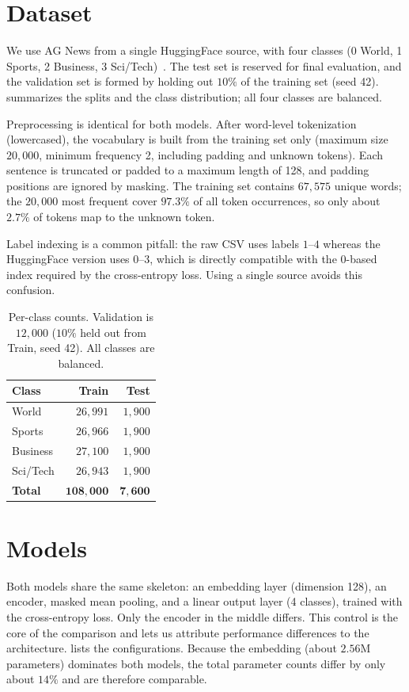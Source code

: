 \documentclass[10pt,twocolumn,letterpaper]{article}
\begin{document}
\section{Dataset}
We use AG News from a single HuggingFace source, with four classes (0 World,
1 Sports, 2 Business, 3 Sci/Tech)~\cite{zhang2015character}. The test set is
reserved for final evaluation, and the validation set is formed by holding out
$10\%$ of the training set (seed 42).  summarizes the splits
and the class distribution; all four classes are balanced.

Preprocessing is identical for both models. After word-level tokenization
(lowercased), the vocabulary is built from the training set only (maximum size
$20{,}000$, minimum frequency 2, including padding and unknown tokens). Each
sentence is truncated or padded to a maximum length of 128, and padding
positions are ignored by masking. The training set contains $67{,}575$ unique
words; the $20{,}000$ most frequent cover $97.3\%$ of all token occurrences, so
only about $2.7\%$ of tokens map to the unknown token.

Label indexing is a common pitfall: the raw CSV uses labels $1$--$4$ whereas
the HuggingFace version uses $0$--$3$, which is directly compatible with the
$0$-based index required by the cross-entropy loss. Using a single source
avoids this confusion.

\begin{table}[t]
\centering\small
\begin{tabular}{lrr}
\toprule
Class & Train & Test \\
\midrule
World & $26{,}991$ & $1{,}900$ \\
Sports & $26{,}966$ & $1{,}900$ \\
Business & $27{,}100$ & $1{,}900$ \\
Sci/Tech & $26{,}943$ & $1{,}900$ \\
\midrule
\textbf{Total} & $\mathbf{108{,}000}$ & $\mathbf{7{,}600}$ \\
\bottomrule
\end{tabular}
\caption{Per-class counts. Validation is $12{,}000$ ($10\%$ held out from
Train, seed 42). All classes are balanced.}
\label{tab:splits}
\end{table}

\section{Models}
Both models share the same skeleton: an embedding layer (dimension 128), an
encoder, masked mean pooling, and a linear output layer (4 classes), trained
with the cross-entropy loss. Only the encoder in the middle differs. This
control is the core of the comparison and lets us attribute performance
differences to the architecture.  lists the configurations.
Because the embedding (about $2.56$M parameters) dominates both models, the
total parameter counts differ by only about $14\%$ and are therefore
comparable.
\end{document}
